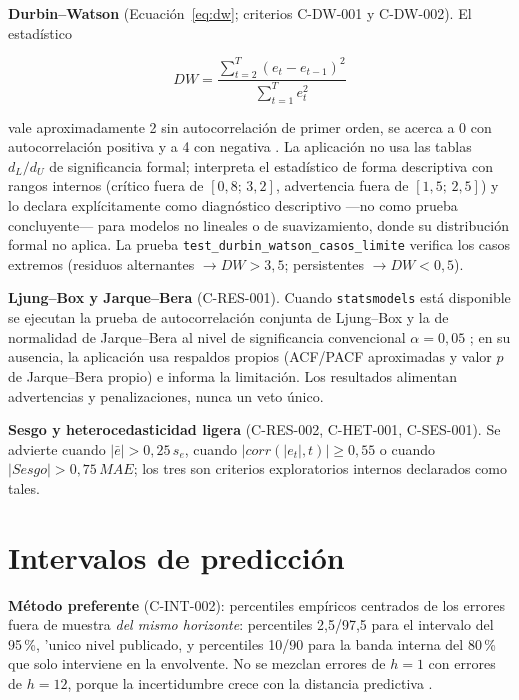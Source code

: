 \documentclass[12pt]{article}
\begin{document}
\textbf{Durbin--Watson} (Ecuaci\'on~\ref{eq:dw}; criterios C-DW-001 y C-DW-002). El estad\'istico

\begin{equation}
DW = \frac{\sum_{t=2}^{T}(e_t - e_{t-1})^2}{\sum_{t=1}^{T}e_t^2}
\label{eq:dw}
\end{equation}

vale aproximadamente 2 sin autocorrelaci\'on de primer orden, se acerca a 0 con autocorrelaci\'on positiva y a 4 con negativa \citep{statsmodels_durbin_watson}. La aplicaci\'on no usa las tablas $d_L/d_U$ de significancia formal; interpreta el estad\'istico de forma descriptiva con rangos internos (cr\'itico fuera de $[0{,}8;\,3{,}2]$, advertencia fuera de $[1{,}5;\,2{,}5]$) y lo declara expl\'icitamente como diagn\'ostico descriptivo ---no como prueba concluyente--- para modelos no lineales o de suavizamiento, donde su distribuci\'on formal no aplica. La prueba \texttt{test\_durbin\_watson\_casos\_limite} verifica los casos extremos (residuos alternantes $\to DW>3{,}5$; persistentes $\to DW<0{,}5$).

\textbf{Ljung--Box y Jarque--Bera} (C-RES-001). Cuando \texttt{statsmodels} est\'a disponible se ejecutan la prueba de autocorrelaci\'on conjunta de Ljung--Box y la de normalidad de Jarque--Bera al nivel de significancia convencional $\alpha=0{,}05$ \citep{statsmodels_ljungbox,statsmodels_jarque_bera}; en su ausencia, la aplicaci\'on usa respaldos propios (ACF/PACF aproximadas y valor $p$ de Jarque--Bera propio) e informa la limitaci\'on. Los resultados alimentan advertencias y penalizaciones, nunca un veto \'unico.

\textbf{Sesgo y heterocedasticidad ligera} (C-RES-002, C-HET-001, C-SES-001). Se advierte cuando $|\bar{e}| > 0{,}25\,s_e$, cuando $|corr(|e_t|, t)| \geq 0{,}55$ o cuando $|Sesgo| > 0{,}75\,MAE$; los tres son criterios exploratorios internos declarados como tales.

\section{Intervalos de predicci\'on}
\label{sec:intervalos}

\textbf{M\'etodo preferente} (C-INT-002): percentiles emp\'iricos centrados de los errores fuera de muestra \emph{del mismo horizonte}: percentiles 2,5/97,5 para el intervalo del 95\,\%, 'unico nivel publicado, y percentiles 10/90 para la banda interna del 80\,\% que solo interviene en la envolvente. No se mezclan errores de $h=1$ con errores de $h=12$, porque la incertidumbre crece con la distancia predictiva \citep{hyndman2021fpp3}.
\end{document}
